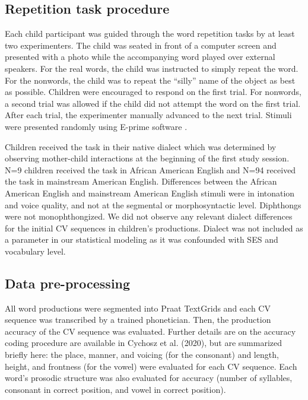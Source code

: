 \documentclass[a4paper,man,natbib,donotrepeattitle, apacite]{apa6}
\begin{document}
\subsection{Repetition task procedure}

Each child participant was guided through the word repetition tasks by at least two experimenters. The child was seated in front of a computer screen and presented with a photo while the accompanying word played over external speakers. For the real words, the child was instructed to simply repeat the word. For the nonwords, the child was to repeat the ``silly'' name of the object as best as possible. Children were encouraged to respond on the first trial. For nonwords, a second trial was allowed if the child did not attempt the word on the first trial. After each trial, the experimenter manually advanced to the next trial. Stimuli were presented randomly using E-prime software \cite{schneiderEPrime2012}. 

Children received the task in their native dialect which was determined by observing mother-child interactions at the beginning of the first study session. N=9 children received the task in African American English and N=94 received the task in mainstream American English. Differences between the African American English and mainstream American English stimuli were in intonation and voice quality, and not at the segmental or morphosyntactic level. Diphthongs were not monophthongized. We did not observe any relevant dialect differences for the initial CV sequences in children’s productions. Dialect was not included as a parameter in our statistical modeling as it was confounded with SES and vocabulary level.

\subsection{Data pre-processing}

All word productions were segmented into Praat TextGrids \cite{boersmaPraatDoingPhonetics2018} and each CV sequence was transcribed by a trained phonetician. Then, the production accuracy of the CV sequence was evaluated. Further details are on the accuracy coding procedure are available in Cychosz et al. (2020), but are summarized briefly here: the place, manner, and voicing (for the consonant) and length, height, and frontness (for the vowel) were evaluated for each CV sequence. Each word’s prosodic structure was also evaluated for accuracy (number of syllables, consonant in correct position, and vowel in correct position). 
\end{document}
